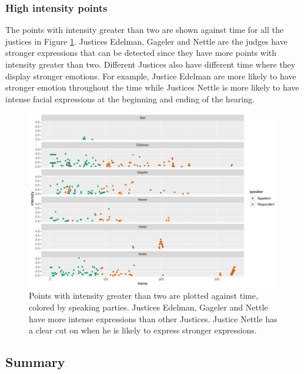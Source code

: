 \documentclass{monashthesis}
\begin{document}
\hypertarget{high-intensity-points}{%
\subsubsection{High intensity points}\label{high-intensity-points}}

The points with intensity greater than two are shown against time for all the justices in Figure \ref{fig:high-intensity-points}. Justices Edelman, Gageler and Nettle are the judges have stronger expressions that can be detected since they have more points with intensity greater than two. Different Justices also have different time where they display stronger emotions. For example, Justice Edelman are more likely to have stronger emotion throughout the time while Justices Nettle is more likely to have intense facial expressions at the beginning and ending of the hearing.

\begin{figure}

{\centering \includegraphics[width=1\linewidth]{figures/high-intensity-points-1} 

}

\caption{Points with intensity greater than two are plotted against time, colored by speaking parties. Justices Edelman, Gageler and Nettle have more intense expressions than other Justices. Justice Nettle has a clear cut on when he is likely to express stronger expressions. }\label{fig:high-intensity-points}
\end{figure}

\newpage

\hypertarget{summary}{%
\subsection{Summary}\label{summary}}
\end{document}
